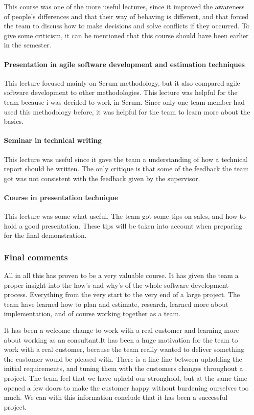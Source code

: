 This course was one of the more useful lectures, since it improved the awareness of people's differences
and that their way of behaving is different, and that forced the team to discuss how to make decisions and solve conflicts if they occurred. To give some criticism, it can be mentioned that this course should have been earlier in the semester.

\paragraph{Presentation in agile software development and estimation techniques}
This lecture focused mainly on Scrum methodology, but it also compared agile software development to other methodologies. This lecture was helpful for the team because i was decided to work in Scrum. Since only one team member had used this methodology before, it was helpful for the team to learn more about the basics. 

\paragraph{Seminar in technical writing}
This lecture was useful since it gave the team a understanding of how a technical report should be written. The only critique is that some of the feedback the team got was not consistent with the feedback given by the supervisor.

\paragraph{Course in presentation technique}
This lecture was some what useful. The team got some tips on sales, and how to hold a good presentation. These tips will be taken into account when preparing for the final demonstration. 

\subsubsection{Final comments}

All in all this has proven to be a very valuable course. It has given the team a proper insight into the how's and why's of the whole software development process. Everything from the very start to the very end of a large project. The team have learned how to plan and estimate, research, learned more about implementation, and of course working together as a team. 

It has been a welcome change to work with a real customer and learning more about working as an consultant.It has been a huge motivation for the team to work with a real customer, because the team really wanted to deliver something the customer would be pleased with. There is a fine line between upholding the initial requirements, and tuning them with the customers changes throughout a project. The team feel that we have upheld our stronghold, but at the same time opened a few doors to
make the customer happy without burdening ourselves too much. We can with this information
conclude that it has been a successful project.

